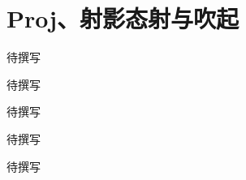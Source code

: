 
% 
% 

\chapter{Proj、射影态射与吹起}
\label{g5:ch:14}

\begin{chapterabstract}
待撰写
\end{chapterabstract}

\begin{learninggoals}
待撰写
\end{learninggoals}

待撰写






\begin{chaptersummary}
待撰写
\end{chaptersummary}

\BookExercises
待撰写
